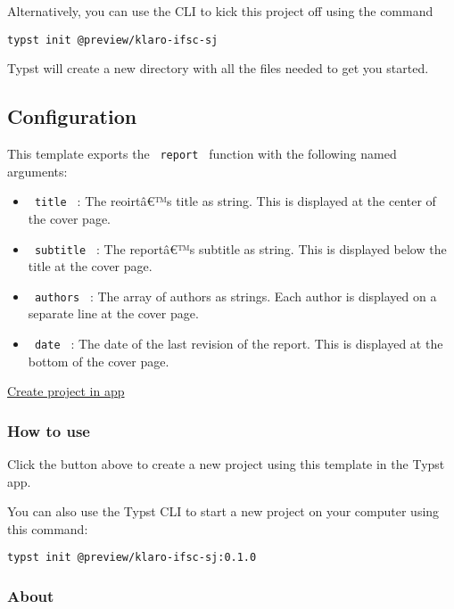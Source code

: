 Alternatively, you can use the CLI to kick this project off using the
command

\begin{verbatim}
typst init @preview/klaro-ifsc-sj
\end{verbatim}

Typst will create a new directory with all the files needed to get you
started.

\subsection{Configuration}\label{configuration}

This template exports the \texttt{\ report\ } function with the
following named arguments:

\begin{itemize}
\tightlist
\item
  \texttt{\ title\ } : The reoirtâ€™s title as string. This is displayed
  at the center of the cover page.
\item
  \texttt{\ subtitle\ } : The reportâ€™s subtitle as string. This is
  displayed below the title at the cover page.
\item
  \texttt{\ authors\ } : The array of authors as strings. Each author is
  displayed on a separate line at the cover page.
\item
  \texttt{\ date\ } : The date of the last revision of the report. This
  is displayed at the bottom of the cover page.
\end{itemize}

\href{/app?template=klaro-ifsc-sj&version=0.1.0}{Create project in app}

\subsubsection{How to use}\label{how-to-use}

Click the button above to create a new project using this template in
the Typst app.

You can also use the Typst CLI to start a new project on your computer
using this command:

\begin{verbatim}
typst init @preview/klaro-ifsc-sj:0.1.0
\end{verbatim}



\subsubsection{About}\label{about}

